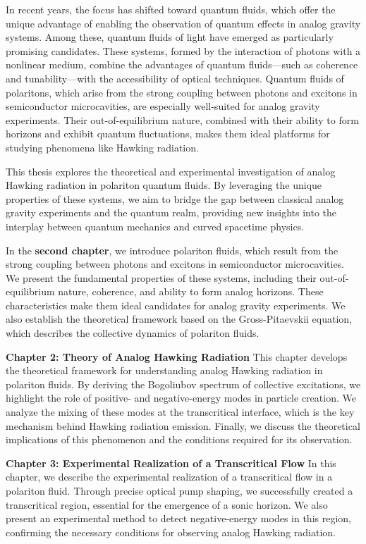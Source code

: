 In recent years, the focus has shifted toward quantum fluids, which offer the unique advantage of enabling the observation of quantum effects in analog gravity systems. Among these, quantum fluids of light have emerged as particularly promising candidates. 
These systems, formed by the interaction of photons with a nonlinear medium, combine the advantages of quantum fluids—such as coherence and tunability—with the accessibility of optical techniques. Quantum fluids of polaritons, which arise from the strong coupling between photons and excitons in semiconductor microcavities, are especially well-suited for analog gravity experiments. 
Their out-of-equilibrium nature, combined with their ability to form horizons and exhibit quantum fluctuations, makes them ideal platforms for studying phenomena like Hawking radiation.

This thesis explores the theoretical and experimental investigation of analog Hawking radiation in polariton quantum fluids. 
By leveraging the unique properties of these systems, we aim to bridge the gap between classical analog gravity experiments and the quantum realm, providing new insights into the interplay between quantum mechanics and curved spacetime physics.

  
In the \textbf{second chapter}, we introduce polariton fluids, which result from the strong coupling between photons and excitons in semiconductor microcavities. We present the fundamental properties of these systems, including their out-of-equilibrium nature, coherence, and ability to form analog horizons. These characteristics make them ideal candidates for analog gravity experiments. 
We also establish the theoretical framework based on the Gross-Pitaevskii equation, which describes the collective dynamics of polariton fluids.

\textbf{Chapter 2: Theory of Analog Hawking Radiation}  
This chapter develops the theoretical framework for understanding analog Hawking radiation in polariton fluids. By deriving the Bogoliubov spectrum of collective excitations, we highlight the role of positive- and negative-energy modes in particle creation. 
We analyze the mixing of these modes at the transcritical interface, which is the key mechanism behind Hawking radiation emission. Finally, we discuss the theoretical implications of this phenomenon and the conditions required for its observation.

\textbf{Chapter 3: Experimental Realization of a Transcritical Flow}  
In this chapter, we describe the experimental realization of a transcritical flow in a polariton fluid. Through precise optical pump shaping, we successfully created a transcritical region, essential for the emergence of a sonic horizon. We also present an experimental method to detect negative-energy modes in this region, confirming the necessary conditions for observing analog Hawking radiation.

